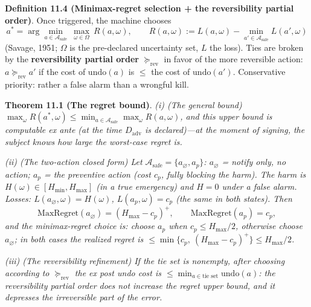 \documentclass[
  11pt]{article}
\begin{document}
\textbf{Definition 11.4 (Minimax-regret selection + the reversibility
partial order)}. Once triggered, the machine chooses
\[a^* = \arg\min_{a \in \mathcal{A}_{\mathrm{safe}}}\ \max_{\omega \in \Omega}\ R(a, \omega), \qquad R(a,\omega) := L(a,\omega) - \min_{a' \in \mathcal{A}_{\mathrm{safe}}} L(a',\omega)\]
(Savage, 1951; \(\Omega\) is the pre-declared uncertainty set, \(L\) the
loss). Ties are broken by the \textbf{reversibility partial order}
\(\succeq_{\mathrm{rev}}\) in favor of the more reversible action:
\(a \succeq_{\mathrm{rev}} a'\) if the cost of \(\mathrm{undo}(a)\) is
\(\le\) the cost of \(\mathrm{undo}(a')\). Conservative priority: rather
a false alarm than a wrongful kill.

\textbf{Theorem 11.1 (The regret bound)}. \emph{(i) (The general bound)
\(\max_\omega R(a^*, \omega) \le \min_{a \in \mathcal{A}_{\mathrm{safe}}} \max_\omega R(a,\omega)\),
and this upper bound is computable ex ante (at the time
\(D_{\mathrm{adv}}\) is declared)---at the moment of signing, the
subject knows how large the worst-case regret is.}

\emph{(ii) (The two-action closed form) Let
\(\mathcal{A}_{\mathrm{safe}} = \{a_\varnothing, a_p\}\):
\(a_\varnothing\) = notify only, no action; \(a_p\) = the preventive
action (cost \(c_p\), fully blocking the harm). The harm is
\(H(\omega) \in [H_{\min}, H_{\max}]\) (in a true emergency) and
\(H = 0\) under a false alarm. Losses:
\(L(a_\varnothing, \omega) = H(\omega)\), \(L(a_p, \omega) = c_p\) (the
same in both states). Then}
\[\mathrm{MaxRegret}(a_\varnothing) = (H_{\max} - c_p)^+, \qquad \mathrm{MaxRegret}(a_p) = c_p,\]
\emph{and the minimax-regret choice is: choose \(a_p\) when
\(c_p \le H_{\max}/2\), otherwise choose \(a_\varnothing\); in both
cases the realized regret is
\(\le \min\{c_p,\ (H_{\max}-c_p)^+\} \le H_{\max}/2\).}

\emph{(iii) (The reversibility refinement) If the tie set is nonempty,
after choosing according to \(\succeq_{\mathrm{rev}}\) the ex post undo
cost is \(\le \min_{a \in \text{tie set}} \mathrm{undo}(a)\): the
reversibility partial order does not increase the regret upper bound,
and it depresses the irreversible part of the error.}
\end{document}
